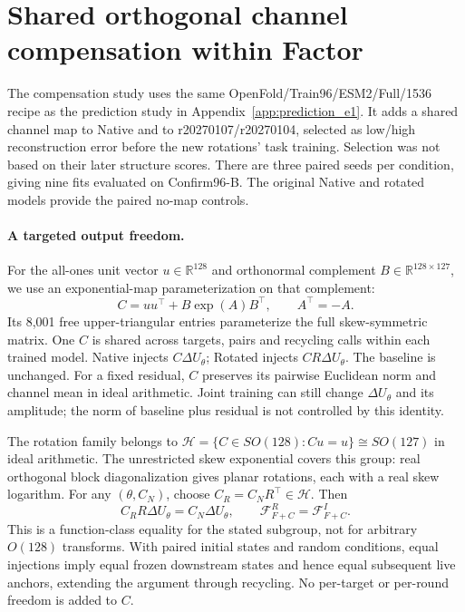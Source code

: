 \clearpage
\section{Shared orthogonal channel compensation within Factor}
\label{app:e2_compensation}
The compensation study uses the same OpenFold/Train96/ESM2/Full/1536 recipe
as the prediction study in Appendix~\ref{app:prediction_e1}. It adds a shared
channel map to Native and to r20270107/r20270104, selected as low/high
reconstruction error before the new rotations' task training. Selection was
not based on their later structure scores. There are three paired seeds per
condition, giving nine fits evaluated on Confirm96-B. The original Native and
rotated models provide the paired no-map controls.

\paragraph{A targeted output freedom.}
For the all-ones unit vector $u\in\mathbb R^{128}$ and orthonormal complement
$B\in\mathbb R^{128\times127}$, we use an exponential-map parameterization
\citep{lezcano2019orthogonal} on that complement:
\begin{equation}
 C=uu^\top+B\exp(A)B^\top,\qquad A^\top=-A.
\end{equation}
Its 8,001 free upper-triangular entries parameterize the full skew-symmetric
matrix. One $C$ is shared across targets, pairs and recycling calls within each
trained model. Native injects $C\Delta U_\theta$; Rotated injects
$CR\Delta U_\theta$. The baseline is unchanged. For a fixed residual, $C$
preserves its pairwise Euclidean norm and channel mean in ideal arithmetic.
Joint training can still change $\Delta U_\theta$ and its amplitude; the norm
of baseline plus residual is not controlled by this identity.

The rotation family belongs to
$\mathcal H=\{C\in SO(128):Cu=u\}\cong SO(127)$ in ideal arithmetic.
The unrestricted skew exponential covers this group: real orthogonal block
diagonalization gives planar rotations, each with a real skew logarithm.
For any $(\theta,C_N)$, choose $C_R=C_NR^\top\in\mathcal H$. Then
\begin{equation}
 C_RR\Delta U_\theta=C_N\Delta U_\theta,
 \qquad \mathcal F_{F+C}^{R}=\mathcal F_{F+C}^{I}.
\end{equation}
This is a function-class equality for the stated subgroup, not for arbitrary
$O(128)$ transforms. With paired initial states and random conditions, equal
injections imply equal frozen downstream states and hence equal subsequent
live anchors, extending the argument through recycling. No per-target or
per-round freedom is added to $C$.


